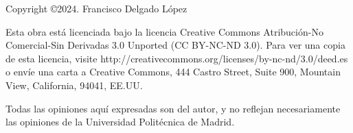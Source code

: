 \begin{flushleft}
	
	Copyright \copyright  2024. Francisco Delgado López
	
	Esta obra está licenciada bajo la licencia Creative Commons Atribución-No Comercial-Sin Derivadas 3.0 Unported (CC BY-NC-ND 3.0). Para ver una copia de esta licencia, visite http://creativecommons.org/licenses/by-nc-nd/3.0/deed.es o envíe una carta a Creative Commons, 444 Castro Street, Suite 900, Mountain View, California, 94041, EE.UU.
	
	Todas las opiniones aquí expresadas son del autor, y no reflejan necesariamente las opiniones
	de la Universidad Politécnica de Madrid.
	
\end{flushleft}